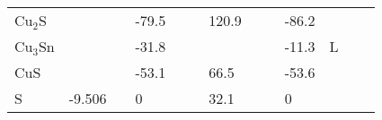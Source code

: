 \begin{landscape}
\begin{center}
\begin{longtable}{|l|p{2.5cm}|l|p{2.5cm}|l|l|p{2.5cm}|l|l|p{2.5cm}|l|l|l|}
Cu$_2$S           	   &                            &     & -79.5               &     &         & 120.9              &     & \citep{Haynes2013} & -86.2                               &     & \citep{Haynes2013} &  \\
Cu$_3$Sn          	   &                            &     & -31.8               &     & \citep{Wagman1982}     &                    &     &     & -11.3                             & L   & \citep{Liu2004} &  \\
CuS              	   &                            &     & -53.1               &     & \citep{Haynes2013}     & 66.5               &     & \citep{Haynes2013} & -53.6                               &     & \citep{Haynes2013} &  \\
S                	   & -9.506                     & \citep{Barin1977} & 0                   &     & \citep{Haynes2013}     & 32.1               &     & \citep{Haynes2013} & 0                                   &     & \citep{Haynes2013} &  \\

\end{longtable}
\end{center}
\end{landscape}
